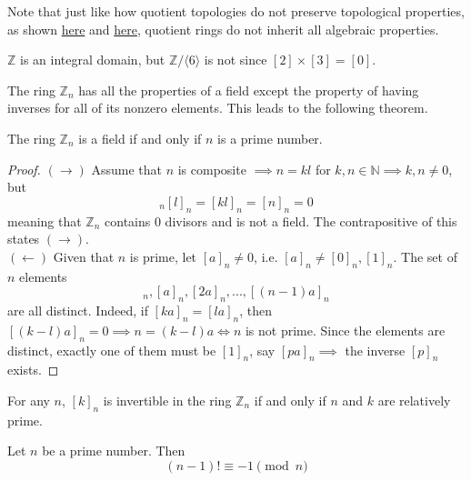     Note that just like how quotient topologies do not preserve topological properties, as shown \hyperref[pst-quotient_trivial]{here} and \hyperref[pst-quotient_hausdorff]{here}, quotient rings do not inherit all algebraic properties. 

    \begin{example}
      $\mathbb{Z}$ is an integral domain, but $\mathbb{Z}/\langle 6 \rangle$ is not since $[2] \times [3] = [0]$. 
    \end{example}


    The ring $\mathbb{Z}_n$ has all the properties of a field except the property of having inverses for all of its nonzero elements. This leads to the following theorem. 

    \begin{theorem}
      The ring $\mathbb{Z}_{n}$ is a field if and only if $n$ is a prime number. 
    \end{theorem}
    \begin{proof}
      $(\rightarrow)$ Assume that $n$ is composite $\implies n = k l$ for $k, n \in \mathbb{N} \implies k, n \neq 0$, but 
      \begin{equation}
        [k]_n [l]_n = [k l]_n = [n]_n = 0
      \end{equation}
      meaning that $\mathbb{Z}_n$ contains $0$ divisors and is not a field. The contrapositive of this states $(\rightarrow)$. \\
      $(\leftarrow)$ Given that $n$ is prime, let $[a]_n \neq 0$, i.e. $[a]_n \neq [0]_n, [1]_n$. The set of $n$ elements 
      \begin{equation}
        [0]_n, [a]_n, [2a]_n, ..., [(n-1)a]_n
      \end{equation}
      are all distinct. Indeed, if $[k a]_n = [l a]_n$, then $[(k-l) a]_n = 0 \implies n = (k-l) a \iff n$ is not prime. Since the elements are distinct, exactly one of them must be $[1]_n$, say $[p a]_n \implies$ the inverse $[p]_n$ exists. 
    \end{proof}

    \begin{corollary}
      For any $n$, $[k]_n$ is invertible in the ring $\mathbb{Z}_n$ if and only if $n$ and $k$ are relatively prime. 
    \end{corollary} 

    \begin{theorem}
      Let $n$ be a prime number. Then 
      \begin{equation}
        (n-1)! \equiv -1 \pmod{n}
      \end{equation}
    \end{theorem}

